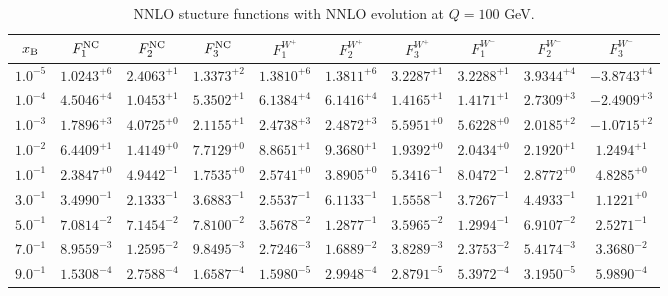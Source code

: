 \begin{table}[h]
\begin{adjustbox}{width=\textwidth}
\begin{tabular}{|c||c|c|c|c|c|c|c|c|c|}
\hline
$x_{\rm B}$ & $F_1^{\rm NC}$ & $F_2^{\rm NC}$ & $F_3^{\rm NC}$ & $F_1^{W^+}$ & $F_2^{W^+}$ & $F_3^{W^+}$ & $F_1^{W^-}$ & $F_2^{W^-}$ & $F_3^{W^-}$ \\
\hline
$ 1.0^{-5}$ & $ 1.0243^{+6}$ & $ 2.4063^{+1}$ & $ 1.3373^{+2}$ & $ 1.3810^{+6}$ & $ 1.3811^{+6}$ & $ 3.2287^{+1}$ & $ 3.2288^{+1}$ & $ 3.9344^{+4}$ & $-3.8743^{+4}$ \\
$ 1.0^{-4}$ & $ 4.5046^{+4}$ & $ 1.0453^{+1}$ & $ 5.3502^{+1}$ & $ 6.1384^{+4}$ & $ 6.1416^{+4}$ & $ 1.4165^{+1}$ & $ 1.4171^{+1}$ & $ 2.7309^{+3}$ & $-2.4909^{+3}$ \\
$ 1.0^{-3}$ & $ 1.7896^{+3}$ & $ 4.0725^{+0}$ & $ 2.1155^{+1}$ & $ 2.4738^{+3}$ & $ 2.4872^{+3}$ & $ 5.5951^{+0}$ & $ 5.6228^{+0}$ & $ 2.0185^{+2}$ & $-1.0715^{+2}$ \\
$ 1.0^{-2}$ & $ 6.4409^{+1}$ & $ 1.4149^{+0}$ & $ 7.7129^{+0}$ & $ 8.8651^{+1}$ & $ 9.3680^{+1}$ & $ 1.9392^{+0}$ & $ 2.0434^{+0}$ & $ 2.1920^{+1}$ & $ 1.2494^{+1}$ \\
$ 1.0^{-1}$ & $ 2.3847^{+0}$ & $ 4.9442^{-1}$ & $ 1.7535^{+0}$ & $ 2.5741^{+0}$ & $ 3.8905^{+0}$ & $ 5.3416^{-1}$ & $ 8.0472^{-1}$ & $ 2.8772^{+0}$ & $ 4.8285^{+0}$ \\
$ 3.0^{-1}$ & $ 3.4990^{-1}$ & $ 2.1333^{-1}$ & $ 3.6883^{-1}$ & $ 2.5537^{-1}$ & $ 6.1133^{-1}$ & $ 1.5558^{-1}$ & $ 3.7267^{-1}$ & $ 4.4933^{-1}$ & $ 1.1221^{+0}$ \\
$ 5.0^{-1}$ & $ 7.0814^{-2}$ & $ 7.1454^{-2}$ & $ 7.8100^{-2}$ & $ 3.5678^{-2}$ & $ 1.2877^{-1}$ & $ 3.5965^{-2}$ & $ 1.2994^{-1}$ & $ 6.9107^{-2}$ & $ 2.5271^{-1}$ \\
$ 7.0^{-1}$ & $ 8.9559^{-3}$ & $ 1.2595^{-2}$ & $ 9.8495^{-3}$ & $ 2.7246^{-3}$ & $ 1.6889^{-2}$ & $ 3.8289^{-3}$ & $ 2.3753^{-2}$ & $ 5.4174^{-3}$ & $ 3.3680^{-2}$ \\
$ 9.0^{-1}$ & $ 1.5308^{-4}$ & $ 2.7588^{-4}$ & $ 1.6587^{-4}$ & $ 1.5980^{-5}$ & $ 2.9948^{-4}$ & $ 2.8791^{-5}$ & $ 5.3972^{-4}$ & $ 3.1950^{-5}$ & $ 5.9890^{-4}$ \\
\hline
\end{tabular}
\end{adjustbox}\caption{NNLO stucture functions with NNLO evolution at $Q = 100$ GeV.}
\label{tab:N2LO-Q100}
\end{table}


